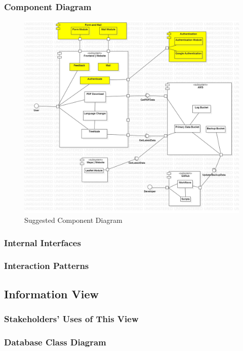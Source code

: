 \subsubsection{Component Diagram}

\begin{figure}[H]
  \centering
  \includegraphics[width=\linewidth]{img/component-diagram-s5.jpg}
  \caption{Suggested Component Diagram}
\end{figure}

\subsubsection{Internal Interfaces}

\subsubsection{Interaction Patterns}

\subsection{Information View}

\subsubsection{Stakeholders' Uses of This View}

\subsubsection{Database Class Diagram}

